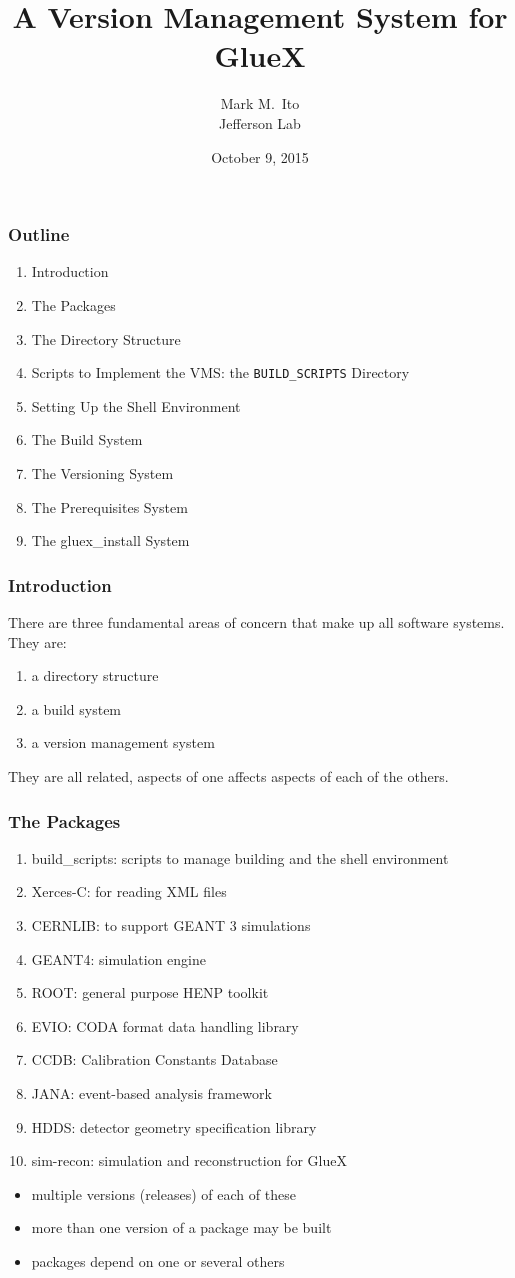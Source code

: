 \documentclass{beamer}
\title{A Version Management System for GlueX}
\author{Mark M.\ Ito \\ \medskip Jefferson Lab}
\date{October 9, 2015}
\newcommand{\be}{\begin{enumerate}}
\newcommand{\ee}{\end{enumerate}}
\newcommand{\I}{\item}
\newcommand{\ft}{\frametitle}
\begin{document}
\maketitle

\begin{frame}
\ft{Outline}
  \be
\I {Introduction}
\I {The Packages}
\I {The Directory Structure}
\I {Scripts to Implement the VMS: the {\tt BUILD\_SCRIPTS} Directory}
\I {Setting Up the Shell Environment}
\I {The Build System}
\I {The Versioning System}
\I {The Prerequisites System}
\I {The gluex\_install System}
\ee
\end{frame}

\begin{frame}\frametitle{Introduction}
There are three fundamental areas of concern that make up all software
systems. They are:

\begin{enumerate}
\item a directory structure
\item a build system
\item a version management system
\end{enumerate}

They are all related, aspects of one affects aspects of each of the others.

\end{frame}\begin{frame}\frametitle{The Packages}

\begin{enumerate}
\item build\_scripts: scripts to manage building and the shell environment
\item Xerces-C: for reading XML files
\item CERNLIB: to support GEANT 3 simulations
\item GEANT4: simulation engine
\item ROOT: general purpose HENP toolkit
\item EVIO: CODA format data handling library
\item CCDB: Calibration Constants Database
\item JANA: event-based analysis framework
\item HDDS: detector geometry specification library 
\item sim-recon: simulation and reconstruction for GlueX
\end{enumerate}

\begin{itemize}
\item multiple versions (releases) of each of these
\item more than one version of a package may be built
\item packages depend on one or several others
\end{itemize}

\end{frame}
\end{document}
